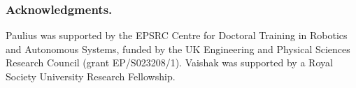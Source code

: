 \documentclass[runningheads]{llncs}
\begin{document}
\subsubsection*{Acknowledgments.}
Paulius was supported by the EPSRC Centre for Doctoral Training in Robotics
and Autonomous Systems, funded by the UK Engineering and Physical Sciences
Research Council (grant EP/S023208/1). Vaishak was supported by a Royal Society
University Research Fellowship.



\end{document}
